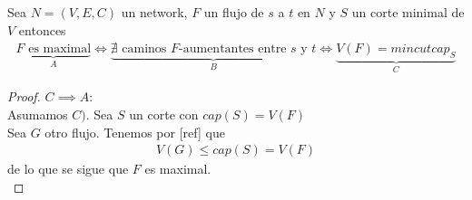 \begin{theorem}
  Sea $N = (V,E,C)$ un network, $F$ un flujo de $s$ a $t$ en $N$ y $S$ un corte minimal de $V$ entonces
  \begin{align}
    \underbrace{F \text{ es maximal}}_{A} \iff 
    \underbrace{\nexists \text{ caminos } F\text{-aumentantes entre $s$ y $t$}}_{B} \iff
    \underbrace{V(F) = mincutcap_S}_{C}
  \end{align}
\end{theorem}
\begin{proof}
  $C \implies A:$\\
  Asumamos $C)$. Sea $S$ un corte con $cap(S) = V(F)$\\
  Sea $G$ otro flujo. Tenemos por [ref] que
  \begin{align} V(G) \le cap(S) = V(F) \end{align}
  de lo que se sigue que $F$ es maximal.\\
  

\end{proof}
